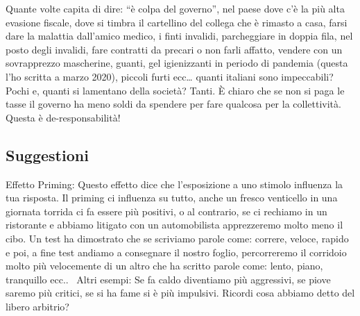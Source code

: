 \documentclass[12pt]{book} %
\begin{document}
Quante volte capita di dire: “è colpa del governo”, nel paese dove c'è la più alta evasione
fiscale, dove si timbra il cartellino del collega che è rimasto a casa, farsi dare la malattia
dall'amico medico, i finti invalidi, parcheggiare in doppia fila, nel posto degli invalidi, fare
contratti da precari o non farli affatto, vendere con un sovrapprezzo mascherine, guanti, gel igienizzanti in periodo
di pandemia (questa l'ho scritta a marzo 2020), piccoli furti ecc… quanti italiani sono
impeccabili? Pochi e, quanti si lamentano della società? Tanti. È chiaro che se non si paga le tasse il governo ha meno
soldi da spendere per fare qualcosa per la collettività. Questa è de-responsabilità!


\bigskip

\subsection{Suggestioni}
Effetto Priming: Questo effetto dice che
l'esposizione a uno stimolo influenza la tua risposta. \newline
Il priming ci influenza su tutto, anche un fresco venticello in una giornata torrida ci fa essere più positivi, o al
contrario, se ci rechiamo in un ristorante e abbiamo litigato con un automobilista apprezzeremo molto meno il cibo. Un
test ha dimostrato che se scriviamo parole come: correre, veloce, rapido e poi, a fine test andiamo a consegnare il
nostro foglio, percorreremo il corridoio molto più velocemente di un altro che ha scritto parole come: lento, piano,
tranquillo ecc.. \ Altri esempi: Se fa caldo diventiamo più aggressivi, se piove saremo più critici, se si ha fame si è
più impulsivi. Ricordi cosa abbiamo detto del libero arbitrio?
\end{document}
